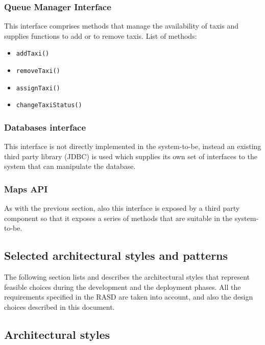 \subsubsection{Queue Manager Interface}
This interface comprises methods that manage the availability of taxis and supplies functions to add or to remove taxis. \newline
List of methods:
\begin{itemize}
	\item \texttt{addTaxi()}
	\item \texttt{removeTaxi()}
	\item \texttt{assignTaxi()}
	\item \texttt{changeTaxiStatus()}
\end{itemize}
\subsubsection{Databases interface}
This interface is not directly implemented in the system-to-be, instead an existing third party library (JDBC) is used which supplies its own set of interfaces to the system that can manipulate the database.
\subsubsection{Maps API}
As with the previous section, also this interface is exposed by a third party component so that it exposes a series of methods that are suitable in the system-to-be.
\subsection{Selected architectural styles and patterns}
\label{sec:arch-styles-patterns}
The following section lists and describes the architectural styles that represent feasible choices during the development and the deployment phases. All the requirements specified in the RASD are taken into account, and also the design choices described in this document. 
\subsection{Architectural styles}

